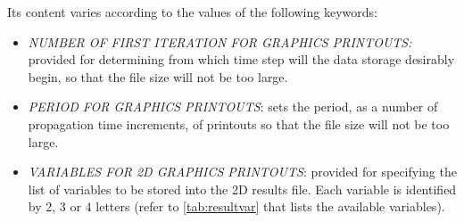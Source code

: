  Its content varies according to the values of the following keywords:

\begin{itemize}
\item  \textit{NUMBER OF FIRST ITERATION FOR GRAPHICS PRINTOUTS:} provided for determining from which time step will the data storage desirably begin, so that the file size will not be too large.
\item  \textit{PERIOD FOR GRAPHICS PRINTOUTS}: sets the period, as a number of propagation time increments, of printouts so that the file size will not be too large.
\item  \textit{VARIABLES FOR 2D GRAPHICS PRINTOUTS}: provided for specifying the list of variables to be stored into the 2D results file. Each variable is identified by 2, 3 or 4 letters (refer to \ref{tab:resultvar} that lists the available variables).
\end{itemize}

